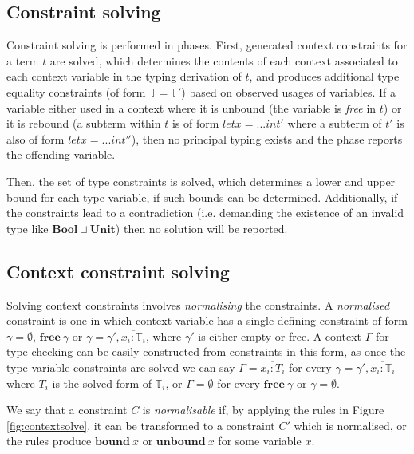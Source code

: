 \documentclass[preprint]{sigplanconf}
\newcommand{\figref}[1]{Figure \ref{#1}}
\newcommand{\unitt}{\mathbf{Unit}}
\newcommand{\boolt}{\mathbf{Bool}}
\newcommand{\free}[1]{\mathbf{free}\:#1}
\newcommand{\tinf}{\mathbb{T}}
\begin{document}
\subsection{Constraint solving}

Constraint solving is performed in phases. First, generated context constraints
for a term $t$ are solved, which determines the contents of each context associated to
each context variable in the typing derivation of $t$, and produces additional
type equality constraints (of form $\mathbb{T} = \mathbb{T}'$) based on
observed usages of variables. If a variable either used in a context where
it is unbound (the variable is {\it free} in $t$) or it is rebound
(a subterm within $t$ is of form $let x = ... in t'$ where a subterm of $t'$
is also of form $let x = ... in t''$), then no principal typing exists and
the phase reports the offending variable.

Then, the set of type constraints is solved, which determines a lower and
upper bound for each type variable, if such bounds can be determined.
Additionally, if the constraints lead to a contradiction (i.e. demanding the
existence of an invalid type like $\boolt \sqcup \unitt$) then no solution
will be reported.

\subsection{Context constraint solving}

Solving context constraints involves {\it normalising} the constraints.
A {\it normalised} constraint is one in which
context variable has a single 
defining constraint of form $\gamma = \emptyset$, $\free{\gamma}$ or
$\gamma = \gamma', \overline{x_i : \tinf_i}$, where $\gamma'$ is
either empty or free. A context $\Gamma$ for type checking can be easily
constructed from constraints in this form, as once the type variable
constraints are solved we can say $\Gamma = \overline{x_i : T_i}$ for
every $\gamma = \gamma', \overline{x_i : \tinf_i}$ where $T_i$ is the
solved form of $\tinf_i$, or $\Gamma = \emptyset$ for every $\free{\gamma}$
or $\gamma = \emptyset$.

We say that a constraint $C$ is {\it normalisable} if, by
applying the rules in \figref{fig:contextsolve}, it can be transformed to
a constraint $C'$ which is normalised, or the rules produce $\mathbf{bound}\:x$
or $\mathbf{unbound}\:x$ for some variable $x$.
\end{document}
